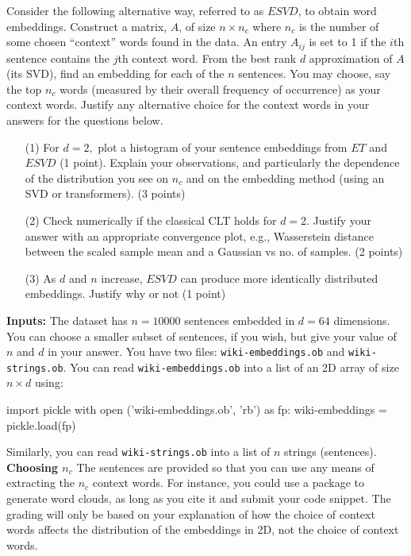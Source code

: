\documentclass[12pt]{article}
\begin{document}
Consider the following alternative way, referred to as $ESVD$, to obtain word embeddings. Construct a matrix, $A$, of size $n \times n_c$ where 
$n_c$ is the number of some chosen ``context'' words found in the data. An entry $A_{ij}$ is set to 1 if the $i$th sentence contains the $j$th context word. 
From the best rank $d$ approximation of $A$ (its SVD), find an embedding for each of the $n$ sentences.
You may choose, say the top $n_c$ words (measured by their overall frequency of occurrence) as your context words. Justify any alternative choice for the context words 
in your answers for the questions below.
\begin{itemize}
\item[(1)] For $d = 2,$ plot a histogram of your sentence embeddings from $ET$ and $ESVD$ (1 point). Explain your observations, and particularly the dependence of the distribution 
 you see on $n_c$ and on the embedding method (using an SVD or transformers). (3 points)
\item[(2)] Check numerically if the classical CLT holds for $d=2$. Justify your answer with an appropriate convergence plot, e.g., Wasserstein distance between the scaled sample mean and a Gaussian vs no. of samples. (2 points)
\item[(3)] As $d$ and $n$ increase, $ESVD$ can produce more identically distributed embeddings. Justify why or not (1 point)  
\end{itemize}

\textbf{Inputs:} The dataset has $n=10000$ sentences embedded in $d=64$ dimensions. You can choose a smaller subset of sentences, if you wish, but give your value of $n$ and $d$ in your answer.
You have two files: \verb+wiki-embeddings.ob+ and \verb+wiki-strings.ob+. 
You can read \verb+wiki-embeddings.ob+ into a list of an 2D array of size $n\times d$ using:
\begin{verbatim*}
import pickle
with open ('wiki-embeddings.ob', 'rb') as fp:
	wiki-embeddings = pickle.load(fp)
\end{verbatim*}
Similarly, you can read \verb+wiki-strings.ob+ into a list of $n$ strings (sentences).\\

\textbf{Choosing $n_c$} The sentences are provided so that you can use any means of extracting the $n_c$ context words. For instance, you could use a package to generate word clouds, as long as you cite it and submit your code snippet.
The grading will only be based on your explanation of how the choice of context words affects the distribution of the embeddings in 2D, not the choice of context words.
\end{document}
